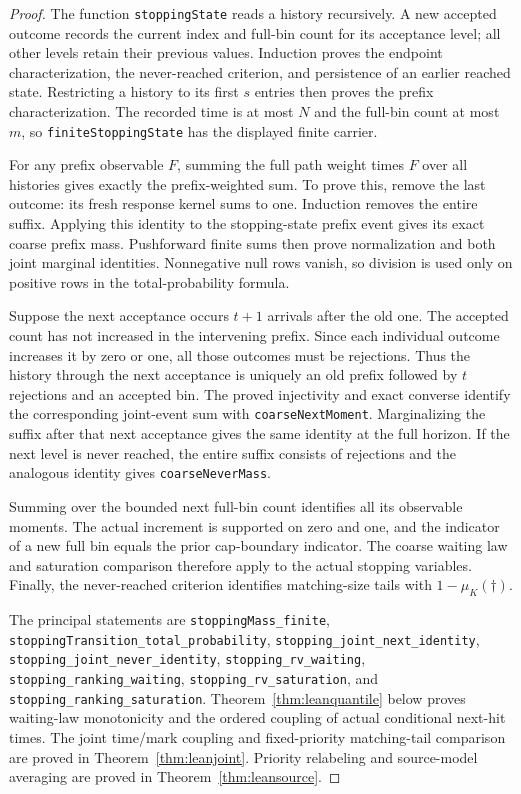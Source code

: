 \documentclass[11pt]{article}
\begin{document}
\begin{proof}
The function \texttt{stoppingState} reads a history recursively. A new
accepted outcome records the current index and full-bin count for its
acceptance level; all other levels retain their previous values.
Induction proves the endpoint characterization, the never-reached
criterion, and persistence of an earlier reached state. Restricting a
history to its first $s$ entries then proves the prefix characterization.
The recorded time is at most $N$ and the full-bin count at most $m$,
so \texttt{finiteStoppingState} has the displayed finite carrier.

For any prefix observable $F$, summing the full path weight times $F$
over all histories gives exactly the prefix-weighted sum. To prove
this, remove the last outcome: its fresh response kernel sums to one.
Induction removes the entire suffix. Applying this identity to the
stopping-state prefix event gives its exact coarse prefix mass.
Pushforward finite sums then prove normalization and both joint
marginal identities. Nonnegative null rows vanish, so division is used
only on positive rows in the total-probability formula.

Suppose the next acceptance occurs $t+1$ arrivals after the old one.
The accepted count has not increased in the intervening prefix. Since
each individual outcome increases it by zero or one, all those outcomes
must be rejections. Thus the history through the next acceptance is
uniquely an old prefix followed by $t$ rejections and an accepted bin.
The proved injectivity and exact converse identify the corresponding
joint-event sum with \texttt{coarseNextMoment}. Marginalizing the suffix
after that next acceptance gives the same identity at the full horizon.
If the next level is never reached, the entire suffix consists of
rejections and the analogous identity gives \texttt{coarseNeverMass}.

Summing over the bounded next full-bin count identifies all its
observable moments. The actual increment is supported on zero and one,
and the indicator of a new full bin equals the prior cap-boundary
indicator. The coarse waiting law and saturation comparison therefore
apply to the actual stopping variables. Finally, the never-reached
criterion identifies matching-size tails with $1-\mu_K(\dagger)$.

The principal statements are \texttt{stoppingMass\_finite},
\texttt{stoppingTransition\_total\_probability},
\texttt{stopping\_joint\_next\_identity},
\texttt{stopping\_joint\_never\_identity},
\texttt{stopping\_rv\_waiting}, \texttt{stopping\_ranking\_waiting},
\texttt{stopping\_rv\_saturation}, and
\texttt{stopping\_ranking\_saturation}.
Theorem~\ref{thm:leanquantile} below proves waiting-law monotonicity
and the ordered coupling of actual conditional next-hit times. The
joint time/mark coupling and fixed-priority matching-tail comparison are
proved in Theorem~\ref{thm:leanjoint}. Priority relabeling and
source-model averaging are proved in Theorem~\ref{thm:leansource}.
\end{proof}
\end{document}
